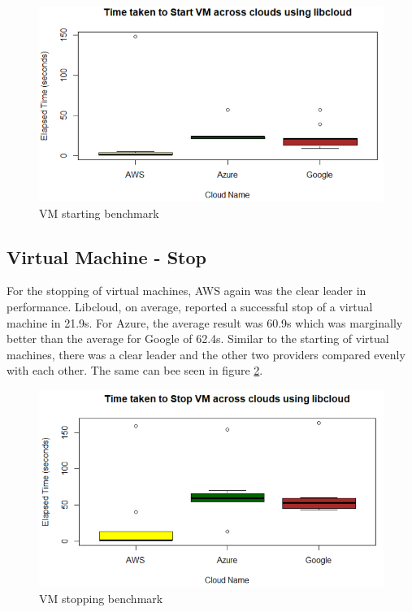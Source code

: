 \begin{figure}[!ht]
  \centering
  \includegraphics[width=\columnwidth]{images/StartVM.png}
  \caption{VM starting benchmark}\label{F:vm-start}
\end{figure}

\subsection{Virtual Machine - Stop}

For the stopping of virtual machines, AWS again was the clear leader in
performance. Libcloud, on average, reported a successful stop of a virtual
machine in 21.9s. For Azure, the average result was 60.9s which was marginally
better than the average for Google of 62.4s. Similar to the starting of virtual
machines, there was a clear leader and the other two providers compared evenly
with each other. The same can bee seen in figure \ref{F:vm-stop}.

\begin{figure}[!ht]
  \centering
  \includegraphics[width=\columnwidth]{images/StopVM.png}
  \caption{VM stopping benchmark}\label{F:vm-stop}
\end{figure}

